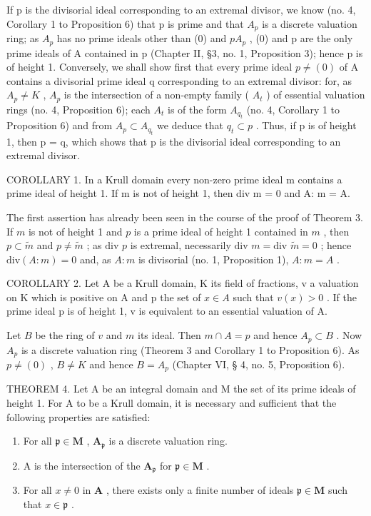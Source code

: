 If p is the divisorial ideal corresponding to an extremal divisor, we know (no. 4, Corollary 1 to Proposition 6) that p is prime and that \(A_{p}\) is a discrete valuation ring; as \(A_{p}\) has no prime ideals other than (0) and \(pA_{p}\) , (0) and p are the only prime ideals of A contained in p (Chapter II, §3, no. 1, Proposition 3); hence p is of height 1. Conversely, we shall show first that every prime ideal \(p \neq (0)\) of A contains a divisorial prime ideal q corresponding to an extremal divisor: for, as \(A_{p} \neq K\) , \(A_{p}\) is the intersection of a non-empty family ( \(A_{t}\) ) of essential valuation rings (no. 4, Proposition 6); each \(A_{t}\) is of the form \(A_{q_{t}}\) (no. 4, Corollary 1 to Proposition 6) and from \(A_{p} \subset A_{q_{t}}\) we deduce that \(q_{t} \subset p\) . Thus, if p is of height 1, then p = q, which shows that p is the divisorial ideal corresponding to an extremal divisor.

COROLLARY 1. In a Krull domain every non-zero prime ideal m contains a prime ideal of height 1. If m is not of height 1, then div m = 0 and A: m = A.

The first assertion has already been seen in the course of the proof of Theorem 3. If \(m\) is not of height 1 and \(p\) is a prime ideal of height 1 contained in \(m\) , then \(p \subset \tilde{m}\) and \(p \neq \tilde{m}\) ; as \(\text{div } p\) is extremal, necessarily \(\text{div } m = \text{div } \tilde{m} = 0\) ; hence \(\text{div}(A: m) = 0\) and, as \(A: m\) is divisorial (no. 1, Proposition 1), \(A: m = A\) .

COROLLARY 2. Let A be a Krull domain, K its field of fractions, v a valuation on K which is positive on A and p the set of \(x \in A\) such that \(v(x) > 0\) . If the prime ideal p is of height 1, v is equivalent to an essential valuation of A.

Let \(B\) be the ring of \(v\) and \(m\) its ideal. Then \(m \cap A = p\) and hence \(A_p \subset B\) . Now \(A_p\) is a discrete valuation ring (Theorem 3 and Corollary 1 to Proposition 6). As \(p \neq (0)\) , \(B \neq K\) and hence \(B = A_p\) (Chapter VI, § 4, no. 5, Proposition 6).

THEOREM 4. Let A be an integral domain and M the set of its prime ideals of height 1. For A to be a Krull domain, it is necessary and sufficient that the following properties are satisfied:

\begin{enumerate}
\def\labelenumi{(\roman{enumi})}
\item
  For all \(\mathfrak{p} \in \mathbf{M}\) , \(\mathbf{A}_{\mathfrak{p}}\) is a discrete valuation ring.
\item
  A is the intersection of the \(\mathbf{A}_{\mathfrak{p}}\) for \(\mathfrak{p} \in \mathbf{M}\) .
\item
  For all \(x \neq 0\) in \(\mathbf{A}\) , there exists only a finite number of ideals \(\mathfrak{p} \in \mathbf{M}\) such that \(x \in \mathfrak{p}\) .
\end{enumerate}

